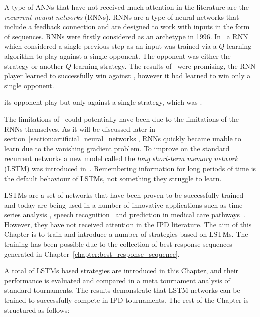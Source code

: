 A type of ANNs that have not received much attention in the literature are the
\textit{recurrent neural networks} (RNNs). RNNs are a type of neural networks
that include a feedback connection and are designed to work with inputs in
the form of sequences. RNNs were firstly considered as an archetype in 1996.
In~\cite{Sandholm1996} a RNN which considered a single previous step
as an input was trained via a \(Q\) learning algorithm to play against a single
opponent. The opponent was either the strategy \TitForTat or another \(Q\)
learning strategy. The results of~\cite{Sandholm1996} were promising, the RNN
player learned to successfully win against \TitForTat, however it had learned
to win only a single opponent.

its opponent play  but only against a single strategy, which
was \TitForTat.

The limitations of~\cite{Sandholm1996} could potentially have been due to the
limitations of the RNNs themselves. As it will be discussed later in
section~\ref{section:artificial_neural_networks}, RNNs
quickly became unable to learn due to the vanishing gradient problem.
To improve on the standard recurrent networks a new model called the
\textit{long short-term memory network} (LSTM) was introduced in~\cite{Hochreiter1997}.
Remembering information for long periods of time
is the default behaviour of LSTMs, not something they struggle to learn.

LSTMs are a set of networks that have been proven to be successfully trained and
today are being used in a number of innovative applications such as time series
analysis \cite{Malhotra2015}, speech recognition~\cite{Sak2014} and prediction
in medical care pathways~\cite{Wang2018_lstm}. However, they have not received
attention in the IPD literature. The aim of this Chapter is to train and
introduce a number of strategies based on LSTMs. The training has been possible
due to the collection of best response sequences generated in
Chapter~\ref{chapter:best_response_sequence}.

A total of \lstmstrategies LSTMs based strategies are introduced in this
Chapter, and their performance is evaluated and compared in a meta tournament
analysis of \metatournamentslstm standard tournaments. The results demonstrate
that LSTM networks can be trained to successfully compete in IPD tournaments.
The rest of the Chapter is structured as follows:

